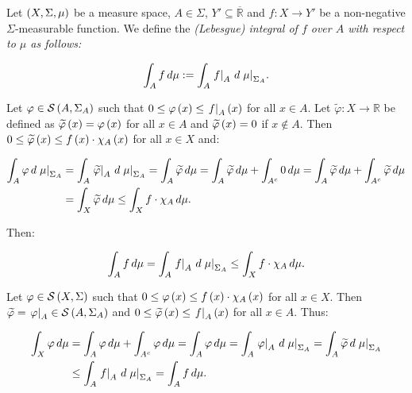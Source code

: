 \begin{remark}
  Let $\left(X,\Sigma,\mu\right)$ be a measure space, $A\in\Sigma$, $Y'\subseteq\overline{\mathbb{R}}$ and $f:X\rightarrow Y'$ be a non-negative $\Sigma$-measurable function. We define the \emph{(Lebesgue) integral of $f$ over $A$ with respect to $\mu$ as follows:}

  \begin{equation}
    \int_{A}{f\,d\mu}:=\int_{A}{\left.f\right|_{A}\,d\left.\mu\right|_{\Sigma_A}}.
  \end{equation}

  Let $\varphi\in\mathcal{S}\left(A,\Sigma_A\right)$ such that $0\leq\varphi\left(x\right)\leq\left.f\right|_{A}\left(x\right)$ for all $x\in A$. Let $\widetilde{\varphi}:X\rightarrow\mathbb{R}$ be defined as $\widetilde{\varphi}\left(x\right)=\varphi\left(x\right)$ for all $x\in A$ and $\widetilde{\varphi}\left(x\right)=0$ if $x\notin A$. Then $0\leq\widetilde{\varphi}\left(x\right)\leq f\left(x\right)\cdot\chi_A\left(x\right)$ for all $x\in X$ and:

  \begin{equation}
    \begin{split}
      \int_{A}{\varphi\,d\left.\mu\right|_{\Sigma_A}} & =\int_{A}{\left.\widetilde{\varphi}\right|_{A}\,d\left.\mu\right|_{\Sigma_A}}=\int_{A}{\widetilde{\varphi}\,d\mu}=\int_{A}{\widetilde{\varphi}\,d\mu}+\int_{A^c}{0\,d\mu}=\int_{A}{\widetilde{\varphi}\,d\mu}+\int_{A^c}{\widetilde{\varphi}\,d\mu}\\
      & =\int_{X}{\widetilde{\varphi}\,d\mu}\leq\int_{X}{f\cdot\chi_A\,d\mu}.
    \end{split}
  \end{equation}

  Then:

  \begin{equation}
    \int_{A}{f\,d\mu}=\int_{A}{\left.f\right|_{A}\,d\left.\mu\right|_{\Sigma_A}}\leq\int_{X}{f\cdot\chi_A\,d\mu}.
  \end{equation}

  Let $\varphi\in\mathcal{S}\left(X,\Sigma\right)$ such that $0\leq\varphi\left(x\right)\leq f\left(x\right)\cdot\chi_A\left(x\right)$ for all $x\in X$. Then $\widetilde{\varphi}=\left.\varphi\right|_{A}\in\mathcal{S}\left(A,\Sigma_A\right)$ and $0\leq\widetilde{\varphi}\left(x\right)\leq\left.f\right|_{A}\left(x\right)$ for all $x\in A$. Thus:

  \begin{equation}
    \begin{split}
      \int_{X}{\varphi\,d\mu} & =\int_{A}{\varphi\,d\mu}+\int_{A^c}{\varphi\,d\mu}=\int_{A}{\varphi\,d\mu}=\int_{A}{\left.\varphi\right|_{A}\,d\left.\mu\right|_{\Sigma_A}}=\int_{A}{\widetilde{\varphi}\,d\left.\mu\right|_{\Sigma_A}}\\
      & \leq\int_{A}{\left.f\right|_{A}\,d\left.\mu\right|_{\Sigma_A}}=\int_{A}{f\,d\mu}.
    \end{split}
  \end{equation}


\end{remark}
